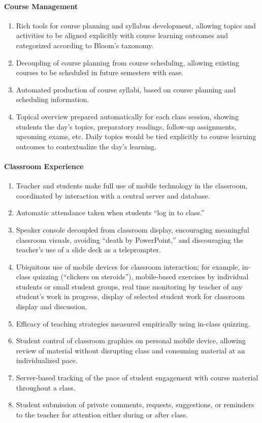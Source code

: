 \documentclass{article}
\begin{document}
\paragraph{Course Management}
\begin{enumerate}
\item Rich tools for course planning and syllabus development, allowing
  topics and activities to be aligned explicitly with course learning outcomes
  and categorized according to Bloom's taxonomy.
\item Decoupling of course planning from course scheduling, allowing existing
  courses to be scheduled in future semesters with ease.
\item Automated production of course syllabi, based on course planning and
  scheduling information.
\item Topical overview prepared automatically for each class session, showing
  students the day's topics, preparatory readings, follow-up assignments,
  upcoming exams, etc. Daily topics would be tied explicitly to course learning
  outcomes to contextualize the day's learning.
\end{enumerate}

\paragraph{Classroom Experience}
\begin{enumerate}
\item Teacher and students make full use of mobile technology in the classroom,
  coordinated by interaction with a central server and database.
\item Automatic attendance taken when students ``log in to class.''
\item Speaker console decoupled from classroom display,
  encouraging meaningful classroom visuals,
  avoiding ``death by PowerPoint,''
  and discouraging the
  teacher's use of a slide deck as a teleprompter.
\item Ubiquitous use of mobile devices for classroom interaction; for example,
  in-class quizzing (``clickers on steroids''), mobile-based exercises by
  individual students or small student groups, real time monitoring by teacher
  of any student's work in progress, display of selected student work for
  classroom display and discussion.
\item Efficacy of teaching strategies measured empirically using in-class
  quizzing.
\item Student control of classroom graphics on personal mobile device, allowing
  review of material without disrupting class and consuming material at an
  individualized pace.
\item Server-based tracking of the pace of student engagement
  with course material throughout a class.
\item Student submission of private comments, requests, suggestions,
  or reminders to the teacher for attention either during or after class.
\end{enumerate}
\end{document}
